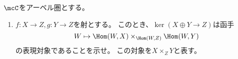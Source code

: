 \documentclass[uplatex,dvipdfmx]{jsarticle}
\begin{document}
\maketitle
\HeaderCommentA
\section{}
\fi


\begin{prob}\label{1.6}
  \(\mcC\)をアーベル圏とする。
  \begin{enumerate}
    \item \label{1.6.1}
    \(f:X\to Z,g: Y\to Z\)を射とする。
    このとき、\(\ker(X\oplus Y\to Z)\)は函手
    \[
    W\mapsto \Hom(W,X) \times_{\Hom(W,Z)}\Hom(W,Y)
    \]
    の表現対象であることを示せ。
    この対象を\(X\times_ZY\)と表す。


\end{enumerate}
\end{prob}
\end{document}
